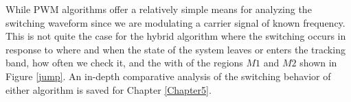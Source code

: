 While PWM algorithms offer a relatively simple means for analyzing the switching waveform since we are modulating a carrier signal of known frequency. This is not quite the case for the hybrid algorithm where the switching occurs in response to where and when the state of the system leaves or enters the tracking band, how often we check it, and the with of the regions $M1$ and $M2$ shown in Figure \ref{jump}. An in-depth comparative analysis of the switching behavior of either algorithm is saved for Chapter \ref{Chapter5}.